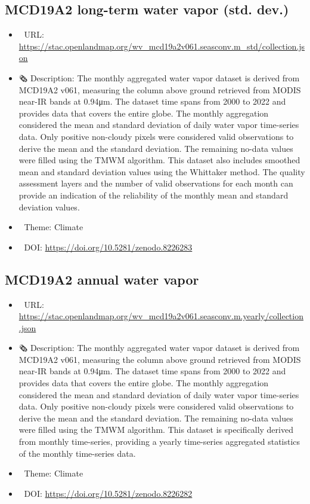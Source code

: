\documentclass[
  graybox,natbib,nospthms]{svmono}
\providecommand{\tightlist}{%
  \setlength{\itemsep}{0pt}\setlength{\parskip}{0pt}}
\providecommand{\tightlist}{\setlength{\itemsep}{0pt}\setlength{\parskip}{0pt}}
\begin{document}
\hypertarget{mcd19a2-long-term-water-vapor-std.-dev.}{%
\subsection{MCD19A2 long-term water vapor (std. dev.)}\label{mcd19a2-long-term-water-vapor-std.-dev.}}

\begin{itemize}
\tightlist
\item
  🔗 URL: \url{https://stac.openlandmap.org/wv_mcd19a2v061.seasconv.m_std/collection.json}
\item
  🗞 Description: The monthly aggregated water vapor dataset is derived from MCD19A2 v061, measuring the column above ground retrieved from MODIS near-IR bands at 0.94μm. The dataset time spans from 2000 to 2022 and provides data that covers the entire globe. The monthly aggregation considered the mean and standard deviation of daily water vapor time-series data. Only positive non-cloudy pixels were considered valid observations to derive the mean and the standard deviation. The remaining no-data values were filled using the TMWM algorithm. This dataset also includes smoothed mean and standard deviation values using the Whittaker method. The quality assessment layers and the number of valid observations for each month can provide an indication of the reliability of the monthly mean and standard deviation values.
\item
  📝 Theme: Climate
\item
  📂 DOI: \url{https://doi.org/10.5281/zenodo.8226283}
\end{itemize}

\hypertarget{mcd19a2-annual-water-vapor}{%
\subsection{MCD19A2 annual water vapor}\label{mcd19a2-annual-water-vapor}}

\begin{itemize}
\tightlist
\item
  🔗 URL: \url{https://stac.openlandmap.org/wv_mcd19a2v061.seasconv.m.yearly/collection.json}
\item
  🗞 Description: The monthly aggregated water vapor dataset is derived from MCD19A2 v061, measuring the column above ground retrieved from MODIS near-IR bands at 0.94μm. The dataset time spans from 2000 to 2022 and provides data that covers the entire globe. The monthly aggregation considered the mean and standard deviation of daily water vapor time-series data. Only positive non-cloudy pixels were considered valid observations to derive the mean and the standard deviation. The remaining no-data values were filled using the TMWM algorithm. This dataset is specifically derived from monthly time-series, providing a yearly time-series aggregated statistics of the monthly time-series data.
\item
  📝 Theme: Climate
\item
  📂 DOI: \url{https://doi.org/10.5281/zenodo.8226282}
\end{itemize}
\end{document}
